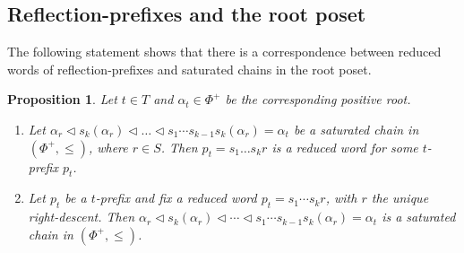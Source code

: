 \documentclass{amsart}
\newtheorem{Proposition}[Theorem]{Proposition}
\theoremstyle{definition}
\begin{document}
\subsection{Reflection-prefixes and the root poset}

The following statement shows that there is a correspondence between reduced words of reflection-prefixes and saturated chains in the root poset. 

\begin{Proposition}\label{prop:PrefRoot} Let $t\in T$ and $\alpha_t\in \Phi^+$ be the corresponding positive root. 
\begin{enumerate}
\item Let  $\alpha_{r}\lhd s_k(\alpha_{r})\lhd\dots\lhd s_1\cdots s_{k-1} s_k(\alpha_r)=\alpha_t$ be a saturated chain in $(\Phi^+,\leq)$, where $r\in S$. Then $p_t=s_1\dots s_kr$ is a reduced word for some $t$-prefix $p_t$. 

\item Let $p_t$ be a  $t$-prefix and fix a reduced word $p_t=s_1\cdots s_k r $, with $r$ the unique right-descent. Then $\alpha_{r}\lhd s_k(\alpha_{r})\lhd\cdots\lhd s_1\cdots s_{k-1} s_k(\alpha_r)=\alpha_t$ is a saturated chain in $(\Phi^+,\leq)$.
\end{enumerate}
\end{Proposition}
%
\end{document}
